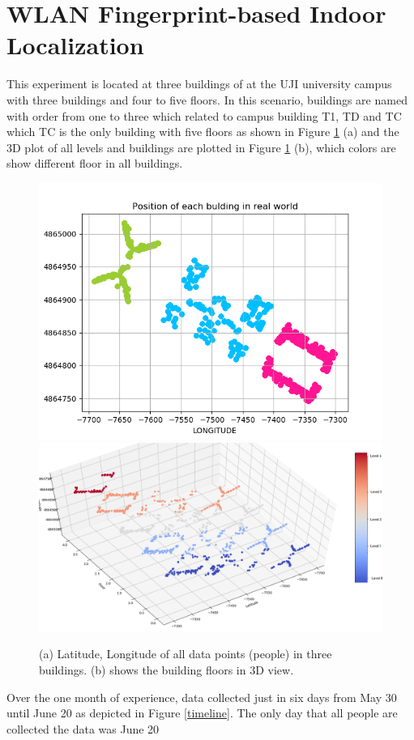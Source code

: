 \documentclass[../UNBThesis2.tex]{subfiles}
\begin{document}

\section{WLAN Fingerprint-based Indoor Localization}

This experiment is located at three buildings of at the UJI university campus with three buildings and four to five floors. In this scenario, buildings are named with order from one to three which related to campus building T1, TD and TC which TC is the only building with five floors as shown in Figure \ref{nama} (a) and the 3D plot of all levels and buildings are plotted in Figure \ref{nama} (b), which colors are show different floor in all buildings. 

\begin{figure}[!h]
    \centering
    \includegraphics[width = 7 cm]{image/Chapters/Chapter6/LatLong.png}\hfill
    \includegraphics[width = 8 cm]{image/Chapters/Chapter6/LatLongFloor.png}
    \\[\smallskipamount]    
    \caption{(a) Latitude, Longitude of all data points (people) in three buildings. (b) shows the building floors in 3D view.}
    \label{nama}
\end{figure}


Over the one month of experience, data collected just in six days from May 30 until June 20 as depicted in Figure \ref{timeline}. The only day that all people are collected the data was June 20
\end{document}
